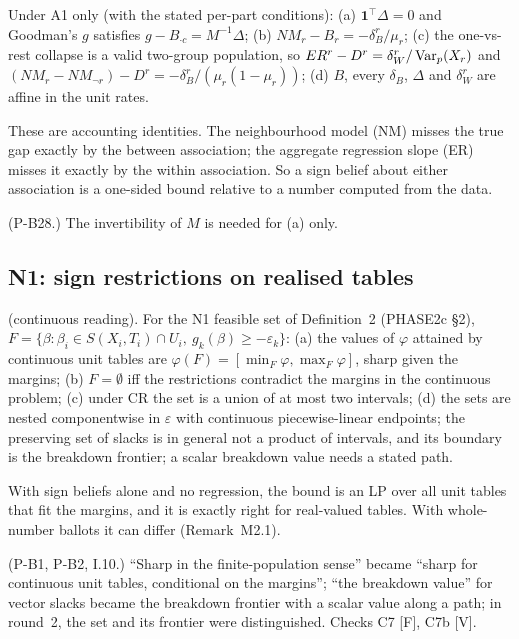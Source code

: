 \begin{result}\label{res:m1}
 Under A1 only (with the stated per-part conditions):
(a) $\mathbf 1^\top\Delta=0$ and Goodman's $g$ satisfies $g-B_{\cdot c}=M^{-1}\Delta$;
(b) $NM_r-B_r=-\delta^r_B/\mu_r$;
(c) the one-vs-rest collapse is a valid two-group population, so
$ER^r-D^r=\delta^r_W/\operatorname{Var}_p(X_r)$ and $(NM_r-NM_{\neg r})-D^r=-\delta^r_B/(\mu_r(1-\mu_r))$;
(d) $B$, every $\delta_B$, $\Delta$ and $\delta^r_W$ are affine in the unit rates.
\end{result}
\begin{plain}
These are accounting identities. The neighbourhood model (NM) misses the true
gap exactly by the between association; the aggregate regression slope (ER) misses
it exactly by the within association. So a sign belief about either association
is a one-sided bound relative to a number computed from the data.
\end{plain}
\begin{revnote}(P-B28.) The invertibility of $M$ is needed for (a) only.\end{revnote}

\subsection{N1: sign restrictions on realised tables}

\begin{result}\label{res:m2}
 (continuous reading). For the N1 feasible set of Definition~2 (PHASE2c \S2), $F=\{\beta:\beta_i\in S(X_i,T_i)\cap
U_i,\ g_k(\beta)\ge-\varepsilon_k\}$: (a) the values of $\varphi$ attained by
continuous unit tables are $\varphi(F)=[\min_F\varphi,\max_F\varphi]$, sharp
given the margins; (b) $F=\emptyset$ iff the restrictions contradict the margins
in the continuous problem; (c) under CR the set is a union of at most two
intervals; (d) the sets are nested componentwise in $\varepsilon$ with continuous
piecewise-linear endpoints; the preserving set of slacks is in general not a
product of intervals, and its boundary is the breakdown frontier; a scalar
breakdown value needs a stated path.
\end{result}
\begin{plain}
With sign beliefs alone and no regression, the bound is an LP over all unit
tables that fit the margins, and it is exactly right for real-valued tables.
With whole-number ballots it can differ (Remark~M2.1).
\end{plain}
\begin{revnote}
(P-B1, P-B2, I.10.) ``Sharp in the finite-population sense'' became ``sharp for
continuous unit tables, conditional on the margins''; ``the breakdown value'' for
vector slacks became the breakdown frontier with a scalar value along a path; in
round~2, the set and its frontier were distinguished. Checks C7 [F], C7b [V].
\end{revnote}


